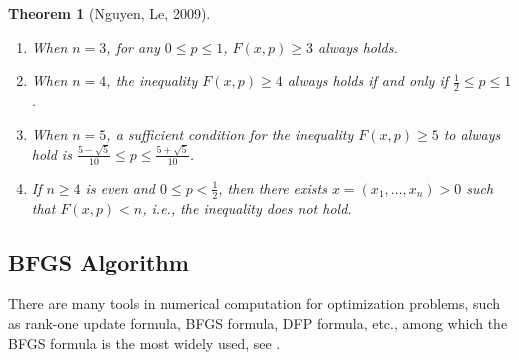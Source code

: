 \documentclass[a4paper,fleqn,numbers]{cas-sc}
\newtheorem{theorem}{Theorem}[section]
\begin{document}
	\begin{theorem}[Nguyen, Le, 2009]
		\begin{enumerate}
			\item When $n=3$, for any $0\leq p\leq 1$, $F(x,p) \geq 3$ always holds.
			\item When $n=4$, the inequality $F(x,p) \geq 4$ always holds if and only if $\frac{1}{2}\leq p \leq 1$.
			\item When $n=5$, a sufficient condition for the inequality $F(x,p) \geq 5$ to always hold is $\frac{5-\sqrt5}{10} \leq p \leq \frac{5+\sqrt5}{10}$.
			\item If $n \geq 4$ is even and $0\leq p < \frac{1}{2}$, then there exists $x=(x_1,\dots,x_n) > 0$ such that $F(x,p)< n$, i.e., the inequality does not hold.
		\end{enumerate}
	\end{theorem}
	
	\subsection{BFGS Algorithm}
	
	There are many tools in numerical computation for optimization problems, such as rank-one update formula, BFGS formula, DFP formula, etc., among which the BFGS formula is the most widely used, see \cite{chen2005}.
	
	
\end{document}
